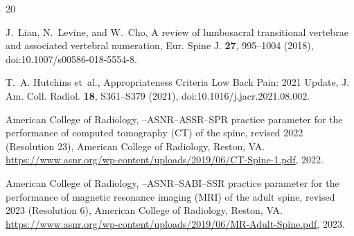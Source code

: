 \documentclass[aapm,mph,amsmath,amssymb,reprint]{revtex4-2}
\begin{document}
\begin{thebibliography}{20}
%
%
\sloppy

J.~Lian, N.~Levine, and W.~Cho,
\newblock A review of lumbosacral transitional vertebrae and associated vertebral numeration,
\newblock Eur. Spine J. {\bf 27}, 995--1004 (2018),
\newblock doi:10.1007/s00586-018-5554-8.

T.~A. Hutchins et~al.,
 {Appropriateness Criteria} Low Back Pain: 2021 Update,
\newblock J. Am. Coll. Radiol. {\bf 18}, S361--S379 (2021),
\newblock doi:10.1016/j.jacr.2021.08.002.

{American College of Radiology},
--{ASNR}--{ASSR}--{SPR} practice parameter for the performance of computed tomography ({CT}) of the spine, revised 2022 ({Resolution} 23),
\newblock American College of Radiology, Reston, VA. \url{https://www.asnr.org/wp-content/uploads/2019/06/CT-Spine-1.pdf}, 2022.

{American College of Radiology},
--{ASNR}--{SABI}--{SSR} practice parameter for the performance of magnetic resonance imaging ({MRI}) of the adult spine, revised 2023 ({Resolution} 6),
\newblock American College of Radiology, Reston, VA. \url{https://www.asnr.org/wp-content/uploads/2019/06/MR-Adult-Spine.pdf}, 2023.


\end{thebibliography}
\end{document}
